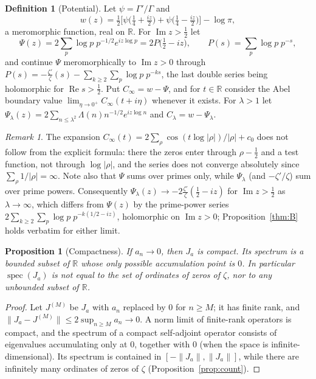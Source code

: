 \documentclass[11pt]{amsart}
\newtheorem{proposition}[theorem]{Proposition}
\theoremstyle{definition}
\newtheorem{definition}[theorem]{Definition}
\theoremstyle{remark}
\newtheorem*{remark*}{Remark}
\renewcommand{\Re}{\operatorname{Re}}
\renewcommand{\Im}{\operatorname{Im}}
\newcommand{\half}{\tfrac12}
\newcommand{\Cinf}{C_\infty}
\newcommand{\Clam}{C_\lambda}
\newcommand{\Psil}{\Psi_\lambda}
\newcommand{\psidig}{\psi}
\DeclareMathOperator{\spec}{spec}
\begin{document}
\begin{definition}[Potential]\label{def:cinf}
Let $\psidig=\Gamma'/\Gamma$ and
\[
w(z)=\tfrac12\Big[\psidig\big(\tfrac14+\tfrac{iz}2\big)+\psidig\big(\tfrac14-\tfrac{iz}2\big)\Big]
-\log\pi,
\]
a meromorphic function, real on $\mathbb R$. For $\Im z>\half$ let
\[
\Psi(z)=2\sum_p\log p\;p^{-1/2}e^{iz\log p}=2P\big(\tfrac12-iz\big),\qquad
P(s)=\sum_p\log p\;p^{-s},
\]
and continue $\Psi$ meromorphically to $\Im z>0$ through $P(s)=-\frac{\zeta'}{\zeta}(s)
-\sum_{k\ge2}\sum_p\log p\;p^{-ks}$, the last double series being holomorphic for
$\Re s>\half$. Put $\Cinf=w-\Psi$, and for $t\in\mathbb R$ consider the Abel boundary value
$\lim_{\eta\to0^+}\Cinf(t+i\eta)$ whenever it exists. For $\lambda>1$ let
$\Psil(z)=2\sum_{n\le\lambda^2}\Lambda(n)n^{-1/2}e^{iz\log n}$ and $\Clam=w-\Psil$.
\end{definition}

\begin{remark*}
The expansion $\Cinf(t)=2\sum_\rho\cos(t\log|\rho|)/|\rho|+c_0$ does not follow from the explicit
formula: there the zeros enter through $\rho-\half$ and a test function, not through
$\log|\rho|$, and the series does not converge absolutely since $\sum_\rho1/|\rho|=\infty$. Note
also that $\Psi$ sums over primes only, while $\Psil$ (and $-\zeta'/\zeta$) sum over prime
powers. Consequently $\Psil(z)\to-2\frac{\zeta'}{\zeta}(\half-iz)$ for $\Im z>\half$ as
$\lambda\to\infty$, which differs from $\Psi(z)$ by the prime-power series
$2\sum_{k\ge2}\sum_p\log p\;p^{-k(1/2-iz)}$, holomorphic on $\Im z>0$;
Proposition~\ref{thm:B} holds verbatim for either limit.
\end{remark*}

\begin{proposition}[Compactness]\label{thm:C}
If $a_n\to0$, then $J_a$ is compact. Its spectrum is a bounded subset of $\mathbb R$ whose only
possible accumulation point is $0$. In particular $\spec(J_a)$ is not equal to the set of
ordinates of zeros of $\zeta$, nor to any unbounded subset of $\mathbb R$.
\end{proposition}
\begin{proof}
Let $J^{(M)}$ be $J_a$ with $a_n$ replaced by $0$ for $n\ge M$; it has finite rank, and
$\|J_a-J^{(M)}\|\le2\sup_{n\ge M}a_n\to0$. A norm limit of finite-rank operators is compact, and
the spectrum of a compact self-adjoint operator consists of eigenvalues accumulating only at $0$,
together with $0$ (when the space is infinite-dimensional). Its spectrum is contained in
$[-\|J_a\|,\|J_a\|]$, while there are infinitely many ordinates of zeros of $\zeta$
(Proposition~\ref{prop:count}).
\end{proof}
\end{document}
